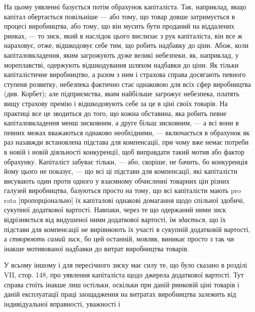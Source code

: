На цьому уявленні базується потім обрахунок капіталіста.
Так, наприклад, якщо капітал обертається повільніше — або тому,
що товар довше затримується в процесі виробництва, або тому,
що він мусить бути проданий на віддалених ринках, — то зиск,
який в наслідок цього вислизає з рук капіталіста, він все ж нараховує,
отже, відшкодовує себе тим, що робить надбавку до
ціни. Абож, коли капіталовкладення, яким загрожують дуже
великі небезпеки, як, наприклад, у мореплавстві, одержують відшкодування
шляхом надбавки до ціни. Як тільки капіталістичне
виробництво, а разом з ним і страхова справа досягають певного
ступеня розвитку, небезпека фактично стає однаковою для
всіх сфер виробництва (див. Корбет); але підприємства, яким
найбільше загрожує небезпека, платять вищу страхову премію
і відшкодовують себе за це в ціні своїх товарів. На практиці
все це зводиться до того, що кожна обставина, яка робить
певне капіталовкладення менш зисковним, а друге більш зисковним,
— а всі вони в певних межах вважаються однаково необхідними,
— включається в обрахунок як раз назавжди встановлена
підстава для компенсації, при чому вже немає потреби в новій
і новій діяльності конкуренції, щоб виправдати такий мотив або
фактор обрахунку. Капіталіст забуває тільки, — або, скоріше,
не бачить, бо конкуренція йому цього не показує, — що всі ці
підстави для компенсації, які капіталісти висувають один проти
одного у взаємному обчисленні товарних цін різних галузей
виробництва, базуються просто на тому, що всі капіталісти мають
pro rata [пропорціонально] їх капіталові однакові домагання
щодо спільної здобичі, сукупної додаткової вартості. Навпаки,
через те що одержаний ними зиск відрізняється від видушеної
ними додаткової вартості, їм \emph{здається}, що їх підстави для
компенсації не вирівнюють їх участі в сукупній додатковій
вартості, а \emph{створюють самий зиск}, бо цей останній, мовляв,
виникає просто з так чи інакше мотивованої надбавки до витрат
виробництва товарів.

У всьому іншому і для пересічного зиску має силу те, що
було сказано в розділі VII, стор. 148, про уявлення капіталіста
щодо джерела додаткової вартості. Тут справа стоїть інакше
лиш остільки, оскільки при даній ринковій ціні товарів і даній
експлуатації праці заощадження на витратах виробництва залежить
від індивідуальної вправності, уважності і~
